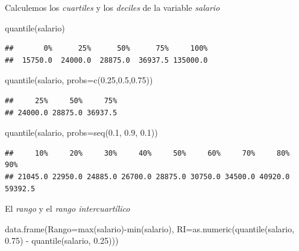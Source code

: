\documentclass[
]{book}
\newenvironment{Shaded}{\begin{snugshade}}{\end{snugshade}}
\newcommand{\AttributeTok}[1]{\textcolor[rgb]{0.77,0.63,0.00}{#1}}
\newcommand{\FloatTok}[1]{\textcolor[rgb]{0.00,0.00,0.81}{#1}}
\newcommand{\FunctionTok}[1]{\textcolor[rgb]{0.00,0.00,0.00}{#1}}
\newcommand{\NormalTok}[1]{#1}
\newcommand{\SpecialCharTok}[1]{\textcolor[rgb]{0.00,0.00,0.00}{#1}}
\theoremstyle{break}
\begin{document}
Calculemos los \emph{cuartiles} y los \emph{deciles} de la variable \emph{salario}

\begin{Shaded}
\begin{Highlighting}[]
\FunctionTok{quantile}\NormalTok{(salario)}
\end{Highlighting}
\end{Shaded}

\begin{verbatim}
##       0%      25%      50%      75%     100% 
##  15750.0  24000.0  28875.0  36937.5 135000.0
\end{verbatim}

\begin{Shaded}
\begin{Highlighting}[]
\FunctionTok{quantile}\NormalTok{(salario, }\AttributeTok{probs=}\FunctionTok{c}\NormalTok{(}\FloatTok{0.25}\NormalTok{,}\FloatTok{0.5}\NormalTok{,}\FloatTok{0.75}\NormalTok{))}
\end{Highlighting}
\end{Shaded}

\begin{verbatim}
##     25%     50%     75% 
## 24000.0 28875.0 36937.5
\end{verbatim}

\begin{Shaded}
\begin{Highlighting}[]
\FunctionTok{quantile}\NormalTok{(salario, }\AttributeTok{probs=}\FunctionTok{seq}\NormalTok{(}\FloatTok{0.1}\NormalTok{, }\FloatTok{0.9}\NormalTok{, }\FloatTok{0.1}\NormalTok{))}
\end{Highlighting}
\end{Shaded}

\begin{verbatim}
##     10%     20%     30%     40%     50%     60%     70%     80%     90% 
## 21045.0 22950.0 24885.0 26700.0 28875.0 30750.0 34500.0 40920.0 59392.5
\end{verbatim}

El \emph{rango} y el \emph{rango intercuartílico}

\begin{Shaded}
\begin{Highlighting}[]
\FunctionTok{data.frame}\NormalTok{(}\AttributeTok{Rango=}\FunctionTok{max}\NormalTok{(salario)}\SpecialCharTok{{-}}\FunctionTok{min}\NormalTok{(salario),}
           \AttributeTok{RI=}\FunctionTok{as.numeric}\NormalTok{(}\FunctionTok{quantile}\NormalTok{(salario, }\FloatTok{0.75}\NormalTok{) }\SpecialCharTok{{-}} \FunctionTok{quantile}\NormalTok{(salario, }\FloatTok{0.25}\NormalTok{)))}
\end{Highlighting}
\end{Shaded}
\end{document}
